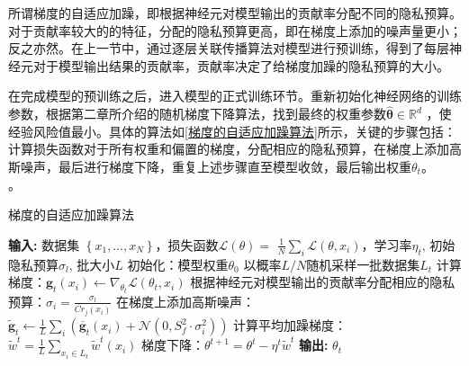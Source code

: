 
所谓梯度的自适应加躁，即根据神经元对模型输出的贡献率分配不同的隐私预算。对于贡献率较大的的特征，分配的隐私预算更高，即在梯度上添加的噪声量更小；反之亦然。在上一节中，通过逐层关联传播算法对模型进行预训练，得到了每层神经元对于模型输出结果的贡献率，贡献率决定了给梯度加躁的隐私预算的大小。

在完成模型的预训练之后，进入模型的正式训练环节。重新初始化神经网络的训练参数，根据第二章所介绍的随机梯度下降算法，找到最终的权重参数$\widehat{\boldsymbol{\theta}} \in \mathbb{R}^{d}$ ，使经验风险值最小。具体的算法如\ref{梯度的自适应加躁算法}所示，关键的步骤包括：计算损失函数对于所有权重和偏置的梯度，分配相应的隐私预算，在梯度上添加高斯噪声，最后进行梯度下降，重复上述步骤直至模型收敛，最后输出权重$\theta_{t}$。\\。

\begin{algorithm}[!htb]
	\caption{梯度的自适应加躁算法}
	\label{梯度的自适应加躁算法}
	\begin{algorithmic}[1]
		\footnotesize
		\STATE \textbf{输入:} 数据集 $\left\{x_{1}, \ldots, x_{N}\right\}$，损失函数$\mathcal{L}(\theta)=$ $\frac{1}{N} \sum_{i} \mathcal{L}\left(\theta, x_{i}\right)$，学习率$\eta_{t}$, 初始隐私预算$\sigma_{l}$, 批大小$L$
		\STATE 初始化：模型权重$\theta_{0}$
			\STATE 以概率$L / N$随机采样一批数据集$L_{t}$
				\STATE 计算梯度：$\mathbf{g}_{t}\left(x_{i}\right) \leftarrow \nabla_{\theta_{t}} \mathcal{L}\left(\theta_{t}, x_{i}\right)$
				\STATE 根据神经元对模型输出的贡献率分配相应的隐私预算：$\sigma_{i}=\frac{\sigma_{l}}{\ddot{Cr_{j}}\left(x_{i}\right)}$
				\STATE 在梯度上添加高斯噪声：$\tilde{\mathbf{g}}_{t} \leftarrow \frac{1}{L} \sum_{i}\left(\overline{\mathbf{g}}_{t}\left(x_{i}\right)+\mathcal{N}\left(0, S_{f}^{2} \cdot \sigma_{i}^{2}\right)\right)$
			\ENDFOR
			\STATE 计算平均加躁梯度：$\tilde{w}^{t}=\frac{1}{L} \sum_{x_{i} \in L_{t}} \tilde{w}^{t}(x_{i})$
			\STATE 梯度下降：$\theta^{t+1}=\theta^{t}-\eta^{t} \tilde{w}^{t}$
		\ENDFOR
		\STATE \textbf{输出:} $\theta_{t}$
	\end{algorithmic}
\end{algorithm}

